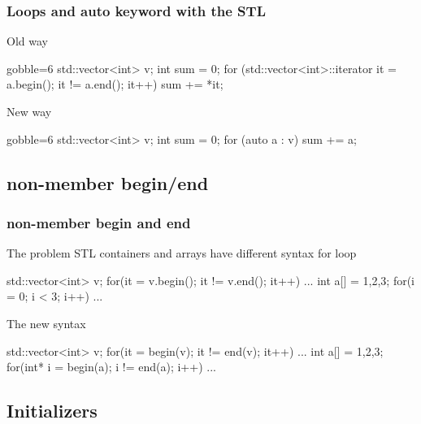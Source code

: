 \begin{frame}[fragile]
  \frametitle{Loops and auto keyword with the STL}
  \begin{block}{Old way}
    \begin{cppcode*}{gobble=6}
      std::vector<int> v;
      int sum = 0;
      for (std::vector<int>::iterator it = a.begin();
           it != a.end();
           it++) {
        sum += *it;
      }
    \end{cppcode*}
  \end{block}
  \pause
  \begin{block}{New way}
    \begin{cppcode*}{gobble=6}
      std::vector<int> v;
      int sum = 0;
      for (auto a : v) { sum += a; }
    \end{cppcode*}
  \end{block}
\end{frame}

\subsection[begin]{non-member begin/end}

\begin{frame}[fragile]
  \frametitle{non-member begin and end}
  \begin{alertblock}{The problem}
    STL containers and arrays have different syntax for loop
    \begin{cppcode}
      std::vector<int> v;
      for(it = v.begin(); it != v.end(); it++) {...}
      int a[] = {1,2,3};
      for(i = 0; i < 3; i++) {...}
    \end{cppcode}
  \end{alertblock}
  \pause
  \begin{block}{The new syntax}
    \begin{cppcode}
      std::vector<int> v;
      for(it = begin(v); it != end(v); it++) {...}
      int a[] = {1,2,3};
      for(int* i = begin(a); i != end(a); i++) {...}
    \end{cppcode}
  \end{block}
\end{frame}

\subsection[init]{Initializers}

